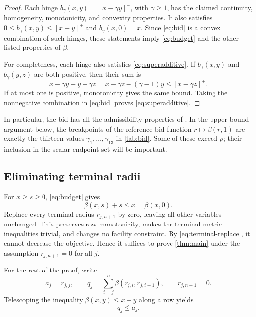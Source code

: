 \documentclass[11pt]{article}
\theoremstyle{definition}
\theoremstyle{remark}
\begin{document}
\begin{proof}
Each hinge $b_\gamma(x,y)=[x-\gamma y]^+$, with $\gamma\ge1$, has the
claimed continuity, homogeneity, monotonicity, and convexity properties.
It also satisfies $0\le b_\gamma(x,y)\le[x-y]^+$ and
$b_\gamma(x,0)=x$. Since \eqref{eq:bid} is a convex combination of such
hinges, these statements imply \eqref{eq:budget} and the other listed
properties of $\beta$.

For completeness, each hinge also satisfies \eqref{eq:superadditive}.
If $b_\gamma(x,y)$ and $b_\gamma(y,z)$ are both positive, then their sum is
\[
  x-\gamma y+y-\gamma z
   =x-\gamma z-(\gamma-1)y
   \le[x-\gamma z]^+.
\]
If at most one is positive, monotonicity gives the same bound. Taking the
nonnegative combination in \eqref{eq:bid} proves
\eqref{eq:superadditive}.
\end{proof}

In particular, the bid has all the admissibility properties of
\cite[Definition~3.1]{source-program}. In the upper-bound argument below,
the breakpoints of the reference-bid function $r\mapsto\beta(r,1)$ are
exactly the thirteen values $\gamma_1,\ldots,\gamma_{13}$ in
\cref{tab:bid}. Some of these exceed $\rho$; their inclusion in the scalar
endpoint set will be important.

\subsection{Eliminating terminal radii}

For $x\ge s\ge0$, \eqref{eq:budget} gives
\begin{equation}\label{eq:terminal-replace}
  \beta(x,s)+s\le x=\beta(x,0).
\end{equation}
Replace every terminal radius $r_{j,n+1}$ by zero, leaving all other variables
unchanged. This preserves row monotonicity, makes the terminal metric
inequalities trivial, and changes no facility constraint. By
\eqref{eq:terminal-replace}, it cannot decrease the objective. Hence it
suffices to prove \cref{thm:main} under the assumption
$r_{j,n+1}=0$ for all $j$.

For the rest of the proof, write
\begin{equation}\label{eq:aj-qj}
  a_j=r_{j,j},\qquad
  q_j=\sum_{i=j}^n\beta(r_{j,i},r_{j,i+1}),\qquad r_{j,n+1}=0.
\end{equation}
Telescoping the inequality $\beta(x,y)\le x-y$ along a row yields
\begin{equation}\label{eq:q-a}
  q_j\le a_j.
\end{equation}
\end{document}

